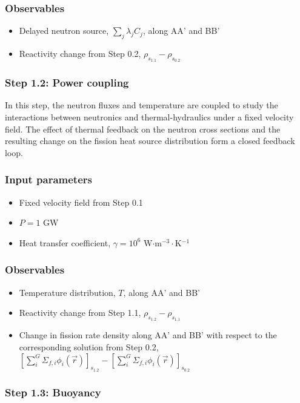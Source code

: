 \subsubsection*{Observables}
\begin{itemize}
    \item Delayed neutron source, $\sum_j \lambda_j C_j$, along AA' and BB'
    \item Reactivity change from Step 0.2, $\rho_{s_{1.1}} - \rho_{s_{0.2}}$
\end{itemize}

\subsubsection{Step 1.2: Power coupling}

In this step, the neutron fluxes and temperature are coupled to study the
interactions between neutronics and thermal-hydraulics under a fixed velocity
field. The effect of thermal feedback on the neutron cross sections and the
resulting change on the fission heat source distribution form a closed feedback
loop.

\subsubsection*{Input parameters}
\begin{itemize}
    \item Fixed velocity field from Step 0.1
    \item $P = 1$ GW
    \item Heat transfer coefficient, $\gamma = 10^6$ W$\cdot$m$^{-3}\cdot$K$^{-1}$
\end{itemize}
%
\subsubsection*{Observables}
\begin{itemize}
    \item Temperature distribution, $T$, along AA' and BB'
    \item Reactivity change from Step 1.1, $\rho_{s_{1.2}} - \rho_{s_{1.1}}$
    \item Change in fission rate density along AA' and BB' with respect to the
    corresponding solution from Step 0.2, $\left[\sum^G_i \Sigma_{f,i} \phi_i(\vec{r})\right]_{s_{1.2}} - \left[\sum^G_i \Sigma_{f,i} \phi_i(\vec{r})\right]_{s_{0.2}}$
\end{itemize}

\subsubsection{Step 1.3: Buoyancy}

